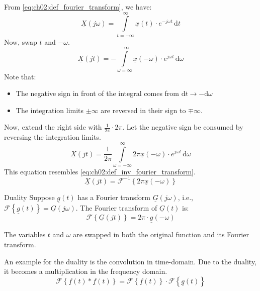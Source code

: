 \begin{refsection}
From \eqref{eq:ch02:def_fourier_transform}, we have:
\begin{equation*}
	\underline{X}(j \omega) = \int\limits_{t = -\infty}^{\infty} \underline{x}(t) \cdot e^{-j \omega t} \, \mathrm{d} t
\end{equation*}
Now, swap $t$ and $-\omega$.
\begin{equation}
	\underline{X}(j t) = - \int\limits_{\omega = \infty}^{-\infty} \underline{x}(-\omega) \cdot e^{j \omega t} \, \mathrm{d} \omega
\end{equation}
Note that:
\begin{itemize}
	\item The negative sign in front of the integral comes from $\mathrm{d} t \rightarrow - \mathrm{d} \omega$
	\item The integration limits $\pm \infty$ are reversed in their sign to $\mp \infty$.
\end{itemize}
Now, extend the right side with $\frac{1}{2 \pi} \cdot 2 \pi$. Let the negative sign be consumed by reversing the integration limits.
\begin{equation}
	\underline{X}(j t) = \frac{1}{2 \pi} \int\limits_{\omega = -\infty}^{\infty} 2 \pi \underline{x}(-\omega) \cdot e^{j \omega t} \, \mathrm{d} \omega
\end{equation}
This equation resembles \eqref{eq:ch02:def_inv_fourier_transform}.
\begin{equation}
	\underline{X}(j t) = \mathcal{F}^{-1} \left\{2 \pi \underline{x}(-\omega)\right\}
\end{equation}

\begin{definition}{Duality}
	Suppose $\underline{g}(t)$ has a Fourier transform $\underline{G}\left(j \omega\right)$, i.e., $\mathcal{F}\left\{\underline{g}(t)\right\} = \underline{G}\left(j \omega\right)$. The Fourier transform of $\underline{G}(t)$ is:
	\begin{equation}
		\mathcal{F}\left\{\underline{G}(j t)\right\} = 2 \pi \cdot \underline{g} \left(-\omega\right)
		\label{eq:ch02:op_duality}
	\end{equation}
	
	The variables $t$ and $\omega$ are swapped in both the original function and its Fourier transform.
\end{definition}

An example for the duality is the convolution in time-domain. Due to the duality, it becomes a multiplication in the frequency domain.
\begin{equation}
	\mathcal{F}\left\{ \underline{f}(t) * \underline{f}(t) \right\} = \mathcal{F}\left\{\underline{f}(t)\right\} \cdot \mathcal{F}\left\{\underline{g}(t)\right\}
	\label{eq:ch02:op_conv}
\end{equation}


\end{refsection}
